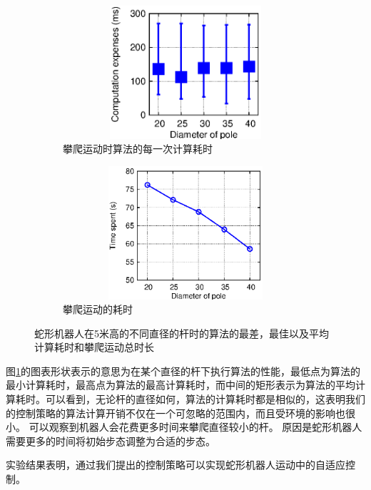 \begin{figure}[htbp]
	\centering
	\begin{subfigure}{0.45\textwidth}{
		\centering
		\includegraphics[width=1\textwidth,height=140pt]{figure/chap05/figCE.eps}
		\caption{攀爬运动时算法的每一次计算耗时}
		\label{fig:ce}
	}
	\end{subfigure}
	\begin{subfigure}{0.45\textwidth}{
		\centering
		\includegraphics[width=1\textwidth,height=140pt]{figure/chap05/TimeSpent.eps}
		\caption{攀爬运动的耗时}
		\label{fig:TS}
	}
	\end{subfigure}
	\caption{蛇形机器人在5米高的不同直径的杆时的算法的最差，最佳以及平均计算耗时和攀爬运动总时长}
	\label{fig:CE-TS}
\end{figure}

图\ref{fig:ce}的图表形状表示的意思为在某个直径的杆下执行算法的性能，最低点为算法的最小计算耗时，最高点为算法的最高计算耗时，而中间的矩形表示为算法的平均计算耗时。可以看到，无论杆的直径如何，算法的计算耗时都是相似的，这表明我们的控制策略的算法计算开销不仅在一个可忽略的范围内，而且受环境的影响也很小。 可以观察到机器人会花费更多时间来攀爬直径较小的杆。 原因是蛇形机器人需要更多的时间将初始步态调整为合适的步态。

实验结果表明，通过我们提出的控制策略可以实现蛇形机器人运动中的自适应控制。



